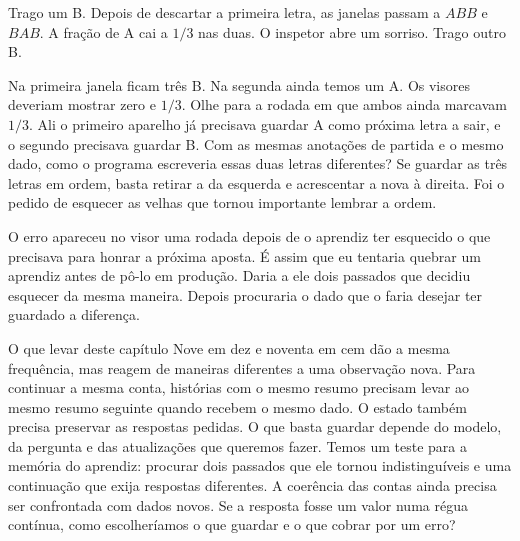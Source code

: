 Trago um B. Depois de descartar a primeira letra, as janelas passam a $ABB$ e $BAB$. A fração de A cai a $1/3$ nas duas. O inspetor abre um sorriso. Trago outro B.

Na primeira janela ficam três B. Na segunda ainda temos um A. Os visores deveriam mostrar zero e $1/3$. Olhe para a rodada em que ambos ainda marcavam $1/3$. Ali o primeiro aparelho já precisava guardar A como próxima letra a sair, e o segundo precisava guardar B. Com as mesmas anotações de partida e o mesmo dado, como o programa escreveria essas duas letras diferentes? Se guardar as três letras em ordem, basta retirar a da esquerda e acrescentar a nova à direita. Foi o pedido de esquecer as velhas que tornou importante lembrar a ordem.

O erro apareceu no visor uma rodada depois de o aprendiz ter esquecido o que precisava para honrar a próxima aposta. É assim que eu tentaria quebrar um aprendiz antes de pô-lo em produção. Daria a ele dois passados que decidiu esquecer da mesma maneira. Depois procuraria o dado que o faria desejar ter guardado a diferença.

\begin{quadro}{O que levar deste capítulo}
 Nove em dez e noventa em cem dão a mesma frequência, mas reagem de maneiras diferentes a uma observação nova.
 Para continuar a mesma conta, histórias com o mesmo resumo precisam levar ao mesmo resumo seguinte quando recebem o mesmo dado.
 O estado também precisa preservar as respostas pedidas. O que basta guardar depende do modelo, da pergunta e das atualizações que queremos fazer.
 Temos um teste para a memória do aprendiz: procurar dois passados que ele tornou indistinguíveis e uma continuação que exija respostas diferentes. A coerência das contas ainda precisa ser confrontada com dados novos.
 Se a resposta fosse um valor numa régua contínua, como escolheríamos o que guardar e o que cobrar por um erro?
\end{quadro}
